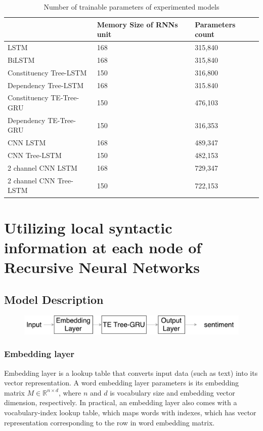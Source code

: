 \begin{table}[H]
    \centering
    \caption{Number of trainable parameters of experimented models}
    \label{table:paramtable}
    \begin{tabular}{lll}
        ~ & Memory Size of RNNs unit & Parameters count \\ \hline
        LSTM                     & 168         & 315,840          \\
        BiLSTM                   & 168         & 315,840          \\
        Constituency Tree-LSTM   & 150         & 316,800          \\
        Dependency Tree-LSTM     & 168         & 315.840          \\
        Constituency TE-Tree-GRU & 150         & 476,103          \\
        Dependency TE-Tree-GRU   & 150         & 316,353          \\
        CNN LSTM                 & 168         & 489,347          \\
        CNN Tree-LSTM            & 150         & 482,153          \\
        2 channel CNN LSTM       & 168         & 729,347          \\
        2 channel CNN Tree-LSTM  & 150         & 722,153         
    \end{tabular}
\end{table}

\hypertarget{sec:VTtree}{\section{Utilizing local  syntactic information at each node of Recursive Neural Networks}}\label{sec:VTtree}
\subsection{Model Description}

\begin{figure}[H]
    \centering
    \includegraphics[width=0.8\linewidth]{figure/vtgrusummary.pdf}
    \caption[]{}
    \label{fig:vtgrusummary}
\end{figure}

\subsubsection{Embedding layer}\label{sec:embedding}
Embedding layer is a lookup table that converts input data (such as text) into its vector representation. A word embedding layer parameters is its embedding matrix $M  \in \mathbb{R}^{n \times d}$, where $n$ and $d$ is vocabulary size and embedding vector dimension, respectively. In practical, an embedding layer also comes with a vocabulary-index lookup table, which maps words with indexes, which has vector representation corresponding to the row in word embedding matrix.
  
